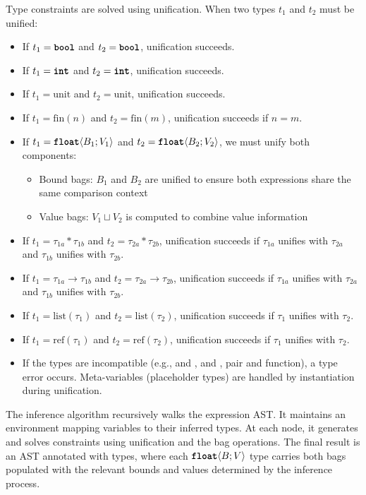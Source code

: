 \documentclass[acmsmall,screen,dvipsnames,x11names,nonacm,anonymous,review]{acmart}
\begin{document}
Type constraints are solved using unification. When two types $t_1$ and $t_2$ must be unified:
\begin{itemize}
    \item If $t_1 = \text{\ttfamily\bfseries bool}$ and $t_2 = \text{\ttfamily\bfseries bool}$, unification succeeds.
    \item If $t_1 = \text{\ttfamily\bfseries int}$ and $t_2 = \text{\ttfamily\bfseries int}$, unification succeeds.
    \item If $t_1 = \text{unit}$ and $t_2 = \text{unit}$, unification succeeds.
    \item If $t_1 = \text{fin}(n)$ and $t_2 = \text{fin}(m)$, unification succeeds if $n = m$.
    \item If $t_1 = \text{\ttfamily\bfseries float}\langle B_1; V_1 \rangle$ and $t_2 = \text{\ttfamily\bfseries float}\langle B_2; V_2 \rangle$, we must unify both components:
        \begin{itemize}
            \item Bound bags: $B_1$ and $B_2$ are unified to ensure both expressions share the same comparison context
            \item Value bags: $V_1 \sqcup V_2$ is computed to combine value information
        \end{itemize}
    \item If $t_1 = \tau_{1a} * \tau_{1b}$ and $t_2 = \tau_{2a} * \tau_{2b}$, unification succeeds if $\tau_{1a}$ unifies with $\tau_{2a}$ and $\tau_{1b}$ unifies with $\tau_{2b}$.
    \item If $t_1 = \tau_{1a} \rightarrow \tau_{1b}$ and $t_2 = \tau_{2a} \rightarrow \tau_{2b}$, unification succeeds if $\tau_{1a}$ unifies with $\tau_{2a}$ and $\tau_{1b}$ unifies with $\tau_{2b}$.
    \item If $t_1 = \text{list}(\tau_1)$ and $t_2 = \text{list}(\tau_2)$, unification succeeds if $\tau_1$ unifies with $\tau_2$.
    \item If $t_1 = \text{ref}(\tau_1)$ and $t_2 = \text{ref}(\tau_2)$, unification succeeds if $\tau_1$ unifies with $\tau_2$.
    \item If the types are incompatible (e.g., \bool{} and \float{}, \intty{} and \float{}, pair and function), a type error occurs. Meta-variables (placeholder types) are handled by instantiation during unification.
\end{itemize}

The inference algorithm recursively walks the expression AST. It maintains an environment mapping variables to their inferred types. At each node, it generates and solves constraints using unification and the bag operations. The final result is an AST annotated with types, where each $\text{\ttfamily\bfseries float}\langle B; V \rangle$ type carries both bags populated with the relevant bounds and values determined by the inference process.
\end{document}

